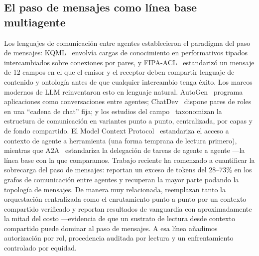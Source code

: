 \documentclass[10pt,twocolumn,letterpaper]{article}
\begin{document}
\subsection{El paso de mensajes como línea base multiagente}
Los lenguajes de comunicación entre agentes establecieron el paradigma del paso
de mensajes: KQML~\citep{finin1994} envolvía cargas de conocimiento en
performativos tipados intercambiados sobre conexiones por pares, y
FIPA-ACL~\citep{fipa2002} estandarizó un mensaje de 12 campos en el que el emisor
y el receptor deben compartir lenguaje de contenido y ontología antes de que
cualquier intercambio tenga éxito. Los marcos modernos de LLM reinventaron esto
en lenguaje natural. AutoGen~\citep{wu2023autogen} programa aplicaciones como
conversaciones entre agentes; ChatDev~\citep{qian2024chatdev} dispone pares de
roles en una ``cadena de chat'' fija; y los estudios del
campo~\citep{guo2024survey} taxonomizan la estructura de comunicación en
variantes punto a punto, centralizada, por capas y de fondo compartido. El Model
Context Protocol~\citep{mcp2024} estandariza el acceso a contexto de
agente a herramienta (una forma temprana de lectura primero), mientras que
A2A~\citep{a2a2025} estandariza la delegación de tareas de agente a agente ---la
línea base con la que comparamos. Trabajo reciente ha comenzado a cuantificar la
sobrecarga del paso de mensajes: \citet{zhang2024agentprune} reportan un exceso
de tokens del 28--73\% en los grafos de comunicación entre agentes y recuperan la
mayor parte podando la topología de mensajes. De manera muy relacionada,
\citet{mao2026delm} reemplazan tanto la orquestación centralizada como el
enrutamiento punto a punto por un contexto compartido verificado y reportan
resultados de vanguardia con aproximadamente la mitad del costo ---evidencia de
que un sustrato de lectura desde contexto compartido puede dominar al paso de
mensajes. A esa línea añadimos autorización por rol, procedencia auditada por
lectura y un enfrentamiento controlado por equidad.
\end{document}
